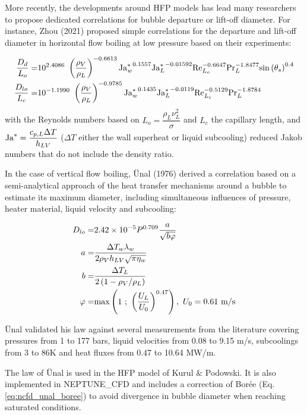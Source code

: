 \npar
More recently, the developments around HFP models has lead many researchers to propose dedicated correlations for bubble departure or lift-off diameter. For instance, Zhou \etal (2021) \cite{zhou_mechanistic_2021} proposed simple correlations for the departure and lift-off diameter in horizontal flow boiling at low pressure based on their experiments:

\begin{align}
\frac{D_{d}}{L_{o}} =& 10^{2.4086}\ \parth{\frac{\rho_{V}}{\rho_{L}}}^{-0.6613} {\Ja^{*}_{w}}^{0.1557} {\Ja^{*}_{L}}^{-0.01592} \Re_{L_{o}}^{-0.6647} \Pr_{L}^{-1.8477} \sin{\theta_{s}}^{0.4}
\label{eq:dd_zhou}
\\
%
\frac{D_{lo}}{L_{c}} =& 10^{-1.1990}\ \parth{\frac{\rho_{V}}{\rho_{L}}}^{-0.9785} {\Ja^{*}_{w}}^{0.1435} {\Ja^{*}_{L}}^{-0.0119} \Re_{L_{c}}^{-0.5129} \Pr_{L}^{-1.8784}
\label{eq:dlo_zhou}
\end{align}
with the Reynolds numbers based on $L_{o} = \dfrac{\rho_{L}\nu_{L}^{2}}{\sigma}$ and $L_{c}$ the capillary length, and $\mathrm{Ja}^{*} = \dfrac{c_{p,L}\Delta T}{h_{LV}}$ ($\Delta T$ either the wall superheat or liquid subcooling) reduced Jakob numbers that do not include the density ratio. 


\npar


In the case of vertical flow boiling, \"Unal (1976)\cite{unal_maximum_1976} derived a correlation based on a semi-analytical approach of the heat transfer mechanisms around a bubble to estimate its maximum diameter, including simultaneous influences of pressure, heater material, liquid velocity and subcooling:

\begin{align}
D_{lo}=& 2.42\times 10^{-5} P^{0.709}\frac{a}{\sqrt{b\varphi}}
\label{eq:dlo_unal}
\\
\nonumber a =& \frac{\Delta T_{w}\lambda_{w}}{2\rho_{V}h_{LV}\sqrt{\pi \eta_{w}} }\\
\nonumber b =& \frac{\Delta T_{L}}{2\left( 1-\rho_{V}/\rho_{L} \right)}\\
\nonumber \varphi=& \mathrm{max}\left( 1\ ;\ \left( \frac{U_{L}}{U_{0}} \right)^{0.47} \right),\ U_{0}=0.61~\mathrm{m/s}
\end{align}

\"Unal validated his law against several measurements from the literature covering pressures from 1 to 177 bars, liquid velocities from 0.08 to 9.15 m/s, subcoolings from 3 to 86K and heat fluxes from 0.47 to 10.64 MW/m.


\begin{note*}{}
The law of \"Unal is used in the HFP model of Kurul \& Podowski. It is also implemented in NEPTUNE\_CFD and includes a correction of Borée \etal (Eq. \ref{eq:ncfd_unal_boree}) to avoid divergence in bubble diameter when reaching saturated conditions.
\end{note*}


